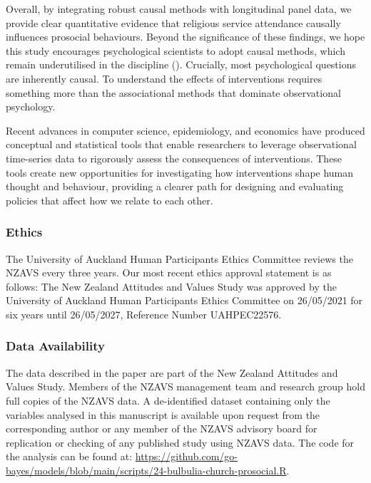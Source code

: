 \documentclass[
  single column]{article}
\begin{document}
Overall, by integrating robust causal methods with longitudinal panel
data, we provide clear quantitative evidence that religious service
attendance causally influences prosocial behaviours. Beyond the
significance of these findings, we hope this study encourages
psychological scientists to adopt causal methods, which remain
underutilised in the discipline
(). Crucially, most
psychological questions are inherently causal. To understand the effects
of interventions requires something more than the associational methods
that dominate observational psychology.

Recent advances in computer science, epidemiology, and economics have
produced conceptual and statistical tools that enable researchers to
leverage observational time-series data to rigorously assess the
consequences of interventions. These tools create new opportunities for
investigating how interventions shape human thought and behaviour,
providing a clearer path for designing and evaluating policies that
affect how we relate to each other.

\newpage{}

\subsubsection{Ethics}\label{ethics}

The University of Auckland Human Participants Ethics Committee reviews
the NZAVS every three years. Our most recent ethics approval statement
is as follows: The New Zealand Attitudes and Values Study was approved
by the University of Auckland Human Participants Ethics Committee on
26/05/2021 for six years until 26/05/2027, Reference Number UAHPEC22576.

\subsubsection{Data Availability}\label{data-availability}

The data described in the paper are part of the New Zealand Attitudes
and Values Study. Members of the NZAVS management team and research
group hold full copies of the NZAVS data. A de-identified dataset
containing only the variables analysed in this manuscript is available
upon request from the corresponding author or any member of the NZAVS
advisory board for replication or checking of any published study using
NZAVS data. The code for the analysis can be found at:
\url{https://github.com/go-bayes/models/blob/main/scripts/24-bulbulia-church-prosocial.R}.
\end{document}
